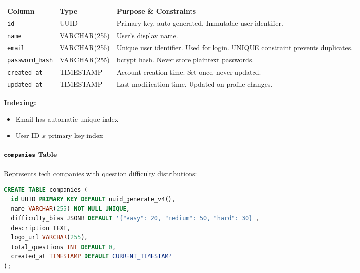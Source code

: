 \documentclass[12pt,a4paper,oneside]{article}
\newcommand{\varname}[1]{\texttt{#1}}
\newcommand{\database}[1]{\texttt{#1}}
\begin{document}
\begin{table}[H]
\centering
\begin{tabular}{|p{2.5cm}|p{2cm}|p{9cm}|}
\hline
\textbf{Column} & \textbf{Type} & \textbf{Purpose \& Constraints} \\
\hline
\varname{id} & UUID & Primary key, auto-generated. Immutable user identifier. \\
\hline
\varname{name} & VARCHAR(255) & User's display name. \\
\hline
\varname{email} & VARCHAR(255) & Unique user identifier. Used for login. UNIQUE constraint prevents duplicates. \\
\hline
\varname{password\_hash} & VARCHAR(255) & bcrypt hash. Never store plaintext passwords. \\
\hline
\varname{created\_at} & TIMESTAMP & Account creation time. Set once, never updated. \\
\hline
\varname{updated\_at} & TIMESTAMP & Last modification time. Updated on profile changes. \\
\hline
\end{tabular}
\end{table}

\textbf{Indexing:}

\begin{itemize}
    \item Email has automatic unique index
    \item User ID is primary key index
\end{itemize}

\paragraph{\database{companies} Table}

Represents tech companies with question difficulty distributions:

\begin{lstlisting}[language=SQL, caption=Companies Table Schema]
CREATE TABLE companies (
  id UUID PRIMARY KEY DEFAULT uuid_generate_v4(),
  name VARCHAR(255) NOT NULL UNIQUE,
  difficulty_bias JSONB DEFAULT '{"easy": 20, "medium": 50, "hard": 30}',
  description TEXT,
  logo_url VARCHAR(255),
  total_questions INT DEFAULT 0,
  created_at TIMESTAMP DEFAULT CURRENT_TIMESTAMP
);
\end{lstlisting}
\end{document}
